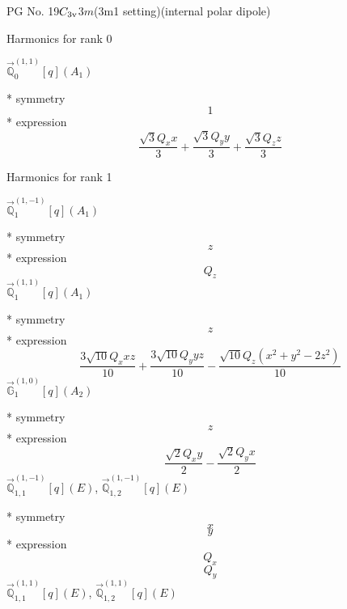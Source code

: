 \documentclass[fleqn,8pt]{jsarticle}
\begin{document}
\setcounter{MaxMatrixCols}{32}

\renewcommand{\tablename}{Table~}
\renewcommand{\figurename}{Figure~}
\begin{center}
\LARGE
PG No. 19\quad$C_{\rm 3v}$\quad$3m$\quad(3m1 setting)\quad[ trigonal ] (internal polar dipole)
\end{center}

\noindent * Harmonics for rank 0

\noindent\quad $\vec{\mathbb{Q}}_{0}^{(1,1)}[q](A_{1})$

\noindent\quad ** symmetry
\begin{dmath*}
1
\end{dmath*}
\noindent\quad ** expression
\begin{dmath*}
\frac{\sqrt{3} Q_{x} x}{3} + \frac{\sqrt{3} Q_{y} y}{3} + \frac{\sqrt{3} Q_{z} z}{3}
\end{dmath*}

\noindent * Harmonics for rank 1

\noindent\quad $\vec{\mathbb{Q}}_{1}^{(1,-1)}[q](A_{1})$

\noindent\quad ** symmetry
\begin{dmath*}
z
\end{dmath*}
\noindent\quad ** expression
\begin{dmath*}
Q_{z}
\end{dmath*}
\noindent\quad $\vec{\mathbb{Q}}_{1}^{(1,1)}[q](A_{1})$

\noindent\quad ** symmetry
\begin{dmath*}
z
\end{dmath*}
\noindent\quad ** expression
\begin{dmath*}
\frac{3 \sqrt{10} Q_{x} x z}{10} + \frac{3 \sqrt{10} Q_{y} y z}{10} - \frac{\sqrt{10} Q_{z} \left(x^{2} + y^{2} - 2 z^{2}\right)}{10}
\end{dmath*}
\noindent\quad $\vec{\mathbb{G}}_{1}^{(1,0)}[q](A_{2})$

\noindent\quad ** symmetry
\begin{dmath*}
z
\end{dmath*}
\noindent\quad ** expression
\begin{dmath*}
\frac{\sqrt{2} Q_{x} y}{2} - \frac{\sqrt{2} Q_{y} x}{2}
\end{dmath*}
\noindent\quad $\vec{\mathbb{Q}}_{1,1}^{(1,-1)}[q](E)$, $\vec{\mathbb{Q}}_{1,2}^{(1,-1)}[q](E)$

\noindent\quad ** symmetry
\begin{dmath*}
x
\end{dmath*}
\begin{dmath*}
y
\end{dmath*}
\noindent\quad ** expression
\begin{dmath*}
Q_{x}
\end{dmath*}
\begin{dmath*}
Q_{y}
\end{dmath*}
\noindent\quad $\vec{\mathbb{Q}}_{1,1}^{(1,1)}[q](E)$, $\vec{\mathbb{Q}}_{1,2}^{(1,1)}[q](E)$
\end{document}
